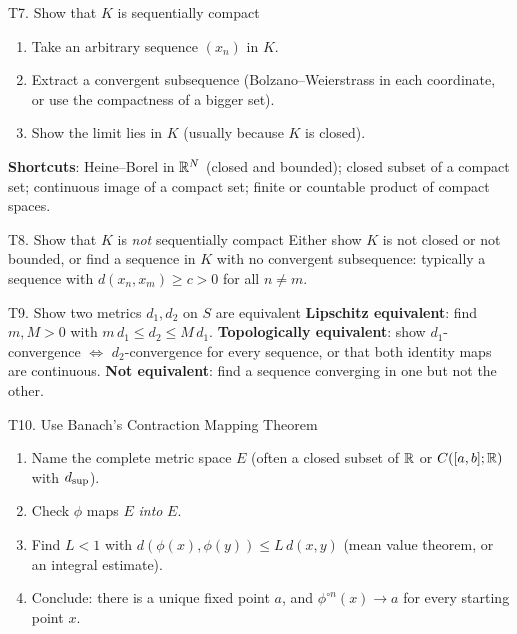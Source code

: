 \begin{steps}{T7. Show that $K$ is sequentially compact}
\begin{enumerate}
\item Take an arbitrary sequence $(x_n)$ in $K$.
\item Extract a convergent subsequence (Bolzano--Weierstrass in each coordinate, or use the
  compactness of a bigger set).
\item Show the limit lies in $K$ (usually because $K$ is closed).
\end{enumerate}
\textbf{Shortcuts}: Heine--Borel in $\mathbb R^N$ (closed and bounded); closed subset of a compact
set; continuous image of a compact set; finite or countable product of compact spaces.
\end{steps}

\begin{steps}{T8. Show that $K$ is \emph{not} sequentially compact}
Either show $K$ is not closed or not bounded, or find a sequence in $K$ with no convergent
subsequence: typically a sequence with $d(x_n,x_m)\ge c>0$ for all $n\ne m$.
\end{steps}

\begin{steps}{T9. Show two metrics $d_1,d_2$ on $S$ are equivalent}
\textbf{Lipschitz equivalent}: find $m,M>0$ with $m\,d_1\le d_2\le M\,d_1$.
\textbf{Topologically equivalent}: show $d_1$-convergence $\iff$ $d_2$-convergence for every
sequence, or that both identity maps are continuous.
\textbf{Not equivalent}: find a sequence converging in one but not the other.
\end{steps}

\begin{steps}{T10. Use Banach's Contraction Mapping Theorem}
\begin{enumerate}
\item Name the complete metric space $E$ (often a closed subset of $\mathbb R$ or $C([a,b];\mathbb R)$
  with $d_{\sup}$).
\item Check $\phi$ maps $E$ \emph{into} $E$.
\item Find $L<1$ with $d(\phi(x),\phi(y))\le L\,d(x,y)$ (mean value theorem, or an integral
  estimate).
\item Conclude: there is a unique fixed point $a$, and $\phi^{\circ n}(x)\to a$ for every
  starting point $x$.
\end{enumerate}
\end{steps}
